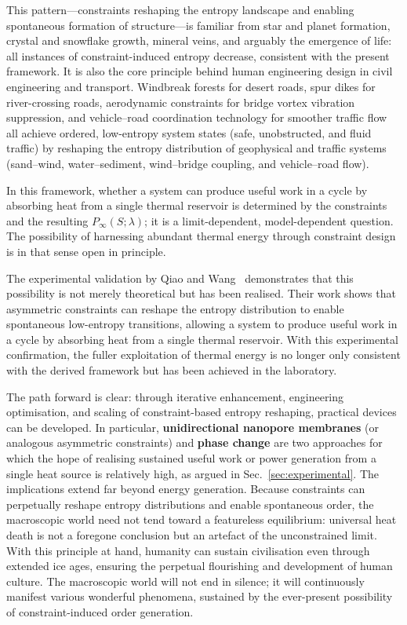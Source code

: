 \documentclass[11pt,a4paper]{article}
\begin{document}
This pattern---constraints reshaping the entropy landscape and enabling spontaneous
formation of structure---is familiar from star and planet formation, crystal and
snowflake growth, mineral veins, and arguably the emergence of life: all instances of
constraint-induced entropy decrease, consistent with the present framework.
It is also the core principle behind human engineering design in civil engineering and transport. 
Windbreak forests for desert roads, spur dikes for river-crossing roads, aerodynamic 
constraints for bridge vortex vibration suppression, and vehicle--road coordination 
technology for smoother traffic flow all achieve ordered, low-entropy system states 
(safe, unobstructed, and fluid traffic) by reshaping the entropy distribution of 
geophysical and traffic systems (sand--wind, water--sediment, wind--bridge coupling, 
and vehicle--road flow).

In this framework, whether a system can produce useful work in a cycle by
absorbing heat from a single thermal reservoir is determined by the constraints
and the resulting $P_{\infty}(S;\lambda)$; it is a limit-dependent,
model-dependent question. The possibility of harnessing abundant thermal energy
through constraint design is in that sense open in principle.

The experimental validation by Qiao and Wang~\cite{qiao2025intrinsicnonequilibriumdistributionlarge}
demonstrates that this possibility is not merely theoretical but has been
realised. Their work shows that asymmetric constraints can reshape the entropy
distribution to enable spontaneous low-entropy transitions, allowing a system to
produce useful work in a cycle by absorbing heat from a single thermal reservoir.
With this experimental confirmation, the fuller exploitation of thermal energy is
no longer only consistent with the derived framework but has been achieved in the
laboratory.

The path forward is clear: through iterative enhancement, engineering optimisation,
and scaling of constraint-based entropy reshaping, practical devices can be
developed. In particular, \textbf{unidirectional nanopore membranes} (or analogous
asymmetric constraints) and \textbf{phase change} are two approaches for which
the hope of realising sustained useful work or power generation from a single
heat source is relatively high, as argued in Sec.~\ref{sec:experimental}. The implications extend far beyond energy generation. Because
constraints can perpetually reshape entropy distributions and enable spontaneous
order, the macroscopic world need not tend toward a featureless equilibrium:
universal heat death is not a foregone conclusion but an artefact of the
unconstrained limit. With this principle at hand, humanity can sustain civilisation
even through extended ice ages, ensuring the perpetual flourishing and development
of human culture. The macroscopic world will not end in silence; it will
continuously manifest various wonderful phenomena, sustained by the ever-present
possibility of constraint-induced order generation.
\end{document}
